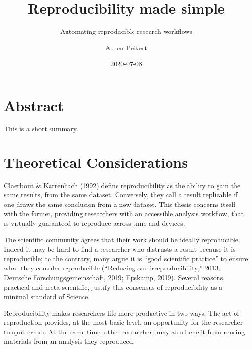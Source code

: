 \documentclass[12pt,a4paper,]{article}
\title{Reproducibility made simple}
\subtitle{Automating reproducible research workflows}
\author{Aaron Peikert}
\date{2020-07-08}
\begin{document}
\maketitle

{
\setcounter{tocdepth}{2}
\tableofcontents
}
\hypertarget{abstract}{%
\section*{Abstract}\label{abstract}}

This is a short summary.

\hypertarget{theoretical-considerations}{%
\section{Theoretical Considerations}\label{theoretical-considerations}}

Claerbout \& Karrenbach (\protect\hyperlink{ref-claerboutElectronicDocumentsGive1992}{1992}) define reproducibility as the ability to gain the same results, from the same dataset.
Conversely, they call a result replicable if one draws the same conclusion from a new dataset.
This thesis concerns itself with the former, providing researchers with an accessible analysis workflow, that is virtually guaranteed to reproduce across time and devices.

The scientific community agrees that their work should be ideally reproducible.
Indeed it may be hard to find a researcher who distrusts a result because it is reproducible; to the contrary, many argue it is ``good scientific practice'' to ensure what they consider reproducible (``Reducing our irreproducibility,'' \protect\hyperlink{ref-AnnouncementReducingOur2013}{2013}; Deutsche Forschungsgemeinschaft, \protect\hyperlink{ref-dfg2019}{2019}; Epskamp, \protect\hyperlink{ref-epskamp2019rep}{2019}).
Several reasons, practical and meta-scientific, justify this consensus of reproducibility as a minimal standard of Science.

Reproducibility makes researchers life more productive in two ways:
The act of reproduction provides, at the most basic level, an opportunity for the researcher to spot errors. At the same time, other researchers may also benefit from reusing materials from an analysis they reproduced.
\end{document}
